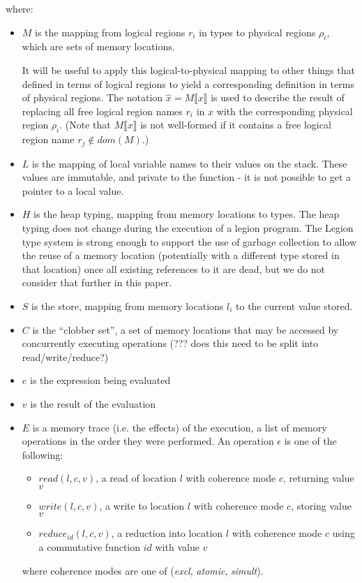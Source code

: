 where: 
\begin{itemize}
\item $M$ is the mapping from logical regions $r_i$ in types to physical regions $\rho_i$, which are sets of memory locations.

It will be useful to apply this logical-to-physical mapping to other
things that defined in terms of logical regions to yield a corresponding definition in terms of
physical regions.  The notation $\hat x = M \llbracket x \rrbracket$ is used to describe the
result of replacing all free logical region names $r_i$ in $x$ with the corresponding physical
region $\rho_i$.  (Note that $M \llbracket x \rrbracket$ is not
well-formed if it contains a free logical region name $r_j \not\in dom(M)$.)
\item $L$ is the mapping of local variable names to their values on the stack.  These values are
immutable, and private to the function - it is not possible to get a pointer to a local value.
\item $H$ is the heap typing, mapping from memory locations to types.  The heap typing does not
change during the execution of a legion program.  The Legion type system is strong enough to
support the use of garbage collection
to allow the reuse of a memory location (potentially with a different type stored in that
location) once all existing references to it are dead, but we
do not consider that further in this paper.
\item $S$ is the store, mapping from memory locations $l_i$ to the current value stored.
\item $C$ is the ``clobber set'', a set of memory locations that may be accessed by concurrently executing operations (??? does this need to be split into read/write/reduce?)
\item $e$ is the expression being evaluated
\item $v$ is the result of the evaluation
\item $E$ is a memory trace (i.e. the effects) of the execution, a list of memory operations
in the order they were performed.  An operation $\epsilon$ is one of the following:
\begin{itemize}
\item $read(l, c, v)$, a read of location $l$ with coherence mode $c$, returning value $v$
\item $write(l, c, v)$, a write to location $l$ with coherence mode $c$, storing value $v$
\item $reduce_{id}(l, c, v)$, a reduction into location $l$ with coherence mode $c$ using a
commutative function $id$ with value $v$
\end{itemize}
where coherence modes are one of ({\em excl}, {\em atomic}, {\em simult}).


\end{itemize}
